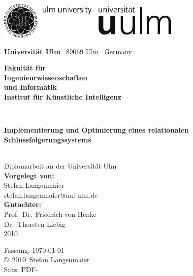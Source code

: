 \documentclass[a4paper,
BCOR=10mm,
bibtotoc,twoside,openright,pointlessnumbers,normalheadings,DIV=9
]{scrbook}
\makeatletter
\newcommand{\fullname}{Stefan Langenmaier}
\newcommand{\email}{stefan.langenmaier@uni-ulm.de}
\newcommand{\titel}{Implementierung und Optimierung eines relationalen Schlussfolgerungssystems}
\newcommand{\jahr}{2010}
\newcommand{\gutachterA}{Prof.~Dr.~Friedrich von Henke}
\newcommand{\gutachterB}{Dr.~Thorsten Liebig}
\newcommand{\betreuer}{Dr.~Thorsten Liebig}
\newcommand{\fakultaet}{Ingenieurwissenschaften\\und Informatik}
\newcommand{\institut}{Institut für Künstliche Intelligenz}
\makeatother
\begin{document}
\frontmatter

\thispagestyle{empty}
\begin{addmargin*}[4mm]{-32mm}

\includegraphics[height=1.8cm]{images/unilogo_bild}
\hfill
\includegraphics[height=1.8cm]{images/unilogo_wort}\\[1em]

{\footnotesize
{\bfseries Universität Ulm} \textbar ~89069 Ulm \textbar ~Germany
\hspace*{60mm}\parbox[t]{48mm}{\bfseries Fakultät für\\
\fakultaet\\
\mdseries \institut}\\[2cm]

\parbox{140mm}{\bfseries \huge \titel}\\[0.5em]
{\footnotesize Diplomarbeit an der Universität Ulm}\\[3em]

{\footnotesize \bfseries Vorgelegt von:}\\
{\footnotesize \fullname\\\email}\\[2em]
{\footnotesize \bfseries Gutachter:}\\                     
{\footnotesize\gutachterA\\
\gutachterB}\\[2em]
{\footnotesize\jahr}
}
\end{addmargin*}


\clearpage
\thispagestyle{empty}
{ \small
  \flushleft
  Fassung, \today \\\vfill
  \copyright~\jahr~\fullname\\[0.5em]

  Satz: PDF-\LaTeXe
}
\end{document}
